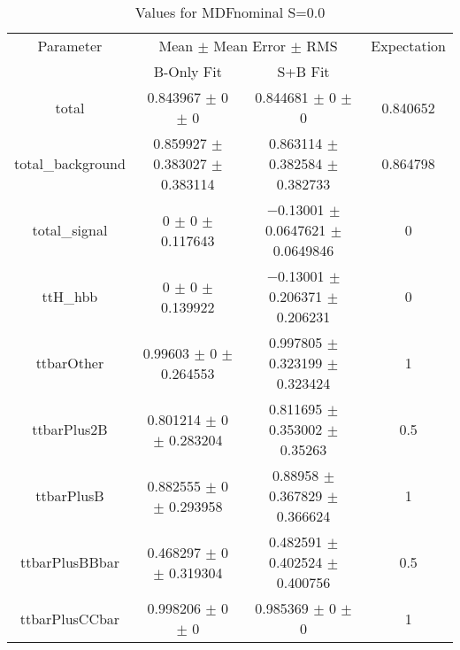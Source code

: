 \begin{table}
\centering
\caption{Values for MDFnominal S=0.0}
\begin{tabular}{cccc}
\toprule
Parameter & \multicolumn{2}{c}{Mean $\pm$ Mean Error $\pm$ RMS} & Expectation\\
 & B-Only Fit & S+B Fit & \\
\midrule
total & \num{0.843967} $\pm$ \num{0} $\pm$ \num{0} & \num{0.844681} $\pm$ \num{0} $\pm$ \num{0} & \num{0.840652}\\
total\_background & \num{0.859927} $\pm$ \num{0.383027} $\pm$ \num{0.383114} & \num{0.863114} $\pm$ \num{0.382584} $\pm$ \num{0.382733} & \num{0.864798}\\
total\_signal & \num{0} $\pm$ \num{0} $\pm$ \num{0.117643} & \num{-0.13001} $\pm$ \num{0.0647621} $\pm$ \num{0.0649846} & \num{0}\\
ttH\_hbb & \num{0} $\pm$ \num{0} $\pm$ \num{0.139922} & \num{-0.13001} $\pm$ \num{0.206371} $\pm$ \num{0.206231} & \num{0}\\
ttbarOther & \num{0.99603} $\pm$ \num{0} $\pm$ \num{0.264553} & \num{0.997805} $\pm$ \num{0.323199} $\pm$ \num{0.323424} & \num{1}\\
ttbarPlus2B & \num{0.801214} $\pm$ \num{0} $\pm$ \num{0.283204} & \num{0.811695} $\pm$ \num{0.353002} $\pm$ \num{0.35263} & \num{0.5}\\
ttbarPlusB & \num{0.882555} $\pm$ \num{0} $\pm$ \num{0.293958} & \num{0.88958} $\pm$ \num{0.367829} $\pm$ \num{0.366624} & \num{1}\\
ttbarPlusBBbar & \num{0.468297} $\pm$ \num{0} $\pm$ \num{0.319304} & \num{0.482591} $\pm$ \num{0.402524} $\pm$ \num{0.400756} & \num{0.5}\\
ttbarPlusCCbar & \num{0.998206} $\pm$ \num{0} $\pm$ \num{0} & \num{0.985369} $\pm$ \num{0} $\pm$ \num{0} & \num{1}\\
\bottomrule
\end{tabular}
\end{table}